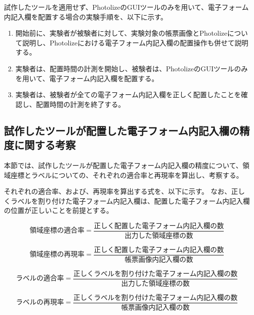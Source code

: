 試作したツールを適用せず、PhotolizeのGUIツールのみを用いて、電子フォーム内記入欄を配置する場合の実験手順を、以下に示す。

\begin{enumerate}
    \item 開始前に、実験者が被験者に対して、実験対象の帳票画像とPhotolizeについて説明し、Photolizeにおける電子フォーム内記入欄の配置操作も併せて説明する。
    \item 実験者は、配置時間の計測を開始し、被験者は、PhotolizeのGUIツールのみを用いて、電子フォーム内記入欄を配置する。
    \item 実験者は、被験者が全ての電子フォーム内記入欄を正しく配置したことを確認し、配置時間の計測を終了する。
\end{enumerate}

\subsection{試作したツールが配置した電子フォーム内記入欄の精度に関する考察}\label{subsec:evalue_accuracy}
本節では、試作したツールが配置した電子フォーム内記入欄の精度について、領域座標とラベルについての、それぞれの適合率と再現率を算出し、考察する。

それぞれの適合率、および、再現率を算出する式を、以下に示す。
なお、正しくラベルを割り付けた電子フォーム内記入欄は、配置した電子フォーム内記入欄の位置が正しいことを前提とする。

\begin{equation}\label{eq:area_precision}
    領域座標の適合率=\frac{正しく配置した電子フォーム内記入欄の数}{出力した領域座標の数}
\end{equation}

\begin{equation}\label{eq:area_recall}
    領域座標の再現率=\frac{正しく配置した電子フォーム内記入欄の数}{帳票画像内記入欄の数}
\end{equation}

\begin{equation}\label{eq:label_precision}
    ラベルの適合率=\frac{正しくラベルを割り付けた電子フォーム内記入欄の数}{出力した領域座標の数}
\end{equation}

\begin{equation}\label{eq:label_recall}
    ラベルの再現率=\frac{正しくラベルを割り付けた電子フォーム内記入欄の数}{帳票画像内記入欄の数}
\end{equation}

